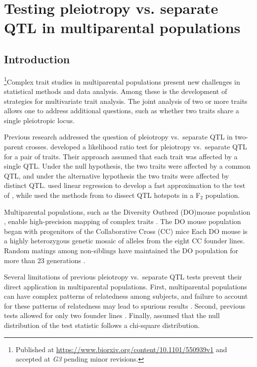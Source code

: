 \documentclass[oneside]{book}\usepackage[]{graphicx}\usepackage[]{color}
\begin{document}
\chapter{Testing pleiotropy vs. separate QTL in multiparental populations}\label{sec:testing}


\section{Introduction}

\footnote{Published at \url{https://www.biorxiv.org/content/10.1101/550939v1} and accepted at \emph{G3} pending minor revisions.}Complex trait studies in multiparental populations present new
challenges in statistical methods and data analysis. Among these is
the development of strategies for multivariate trait analysis. The
joint analysis of two or more traits allows one to address additional
questions, such as whether two traits share a single pleiotropic
locus.




Previous research addressed the question of pleiotropy vs.\ separate
QTL in two-parent crosses.
\citet{jiang1995multiple} developed a likelihood
ratio test for pleiotropy vs.\ separate QTL for a pair of traits.
Their approach assumed that each trait was affected by a single QTL.
Under the null hypothesis, the two traits were affected by a common
QTL, and under the alternative hypothesis the two traits were affected
by distinct QTL.
\citet{knott2000multitrait} used linear regression to develop a fast
approximation to the test of \citet{jiang1995multiple}, while
\citet{tian2016dissection} used the methods from
\citet{knott2000multitrait} to dissect QTL hotspots in a F$_2$
population.




Multiparental populations, such
as the Diversity Outbred (DO)mouse population \citep{churchill2012diversity}, enable high-precision
mapping of complex traits \citep{de2014genetics}. The DO
mouse population began with progenitors of the Collaborative
Cross (CC) mice \citep{churchill2004collaborative}
Each DO mouse is a highly heterozygous genetic mosaic
of alleles from the eight CC founder lines. Random
matings among non-siblings have maintained the DO
population for more than 23 generations \citep{chesler2016diversity}.

Several limitations of previous pleiotropy vs.\ separate QTL tests
prevent their direct application in multiparental populations. First,
multiparental populations can have complex patterns of relatedness
among subjects, and failure to account for these patterns of
relatedness may lead to spurious results \citep{yang2014advantages}.
Second, previous tests allowed for only two founder lines
\citep{jiang1995multiple}. Finally, \citet{jiang1995multiple} assumed
that the null distribution of the test statistic follows a chi-square
distribution.
\end{document}
